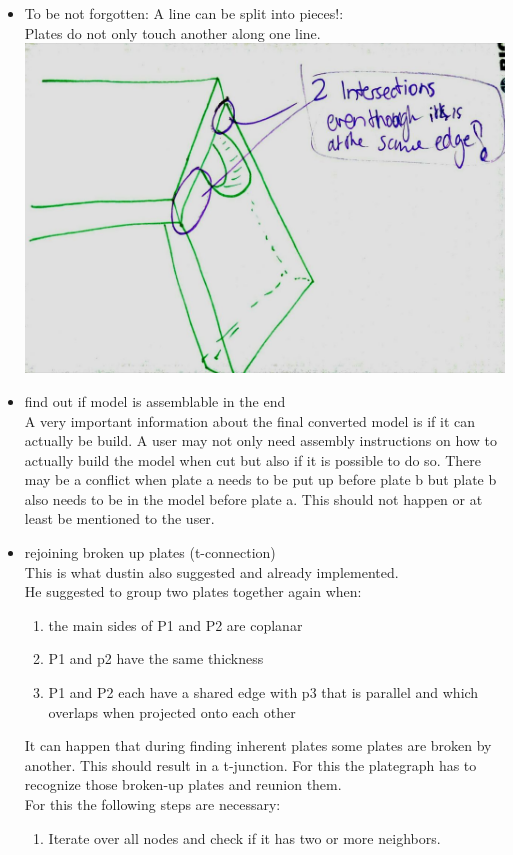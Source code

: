 \documentclass[../ClassicThesis.tex]{subfiles}
\begin{document}
\begin{itemize}
    \item To be not forgotten: A line can be split into pieces!:\\
    Plates do not only touch another along one line. \\
    \includegraphics[width=0.5\columnwidth]{Images/06-2-joints-moreThanOneLinePerEdge.jpg}
    \item find out if model is assemblable in the end\\
    A very important information about the final converted model is if it can actually be build. A user may not only need assembly instructions on how to actually build the model when cut but also if it is possible to do so. There may be a conflict when plate a needs to be put up before plate b but plate b also needs to be in the model before plate a. This should not happen or at least be mentioned to the user.
    \item rejoining broken up plates (t-connection)\\
    This is what dustin also suggested and already implemented.\\
    He suggested to group two plates together again when:\\
    \begin{enumerate}
        \item the main sides of P1 and P2 are coplanar
        \item P1 and p2 have the same thickness
        \item P1 and P2 each have a shared edge with p3 that is parallel and which overlaps when projected onto each other
    \end{enumerate}
    It can happen that during finding inherent plates some plates are broken by another. This should result in a t-junction. For this the plategraph has to recognize those broken-up plates and reunion them. \\
    For this the following steps are necessary:
    \begin{enumerate}
        \item Iterate over all nodes and check if it has two or more neighbors. 

\end{enumerate}
\end{itemize}
\end{document}
